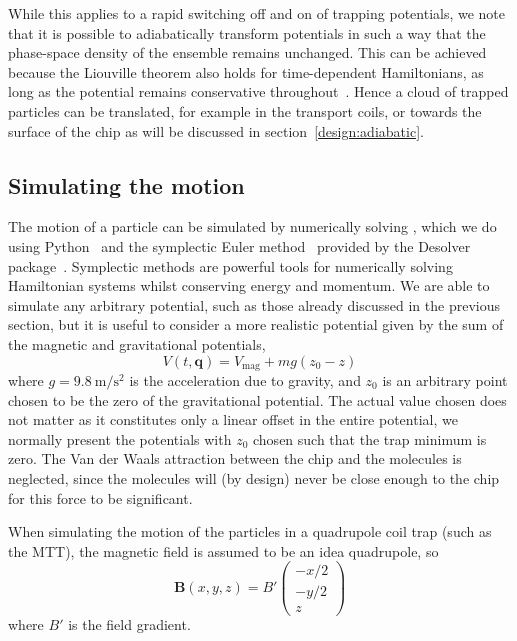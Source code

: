 While this applies to a rapid switching off and on of trapping potentials, we
note that it is possible to adiabatically transform potentials in such a way
that the phase-space density of the ensemble remains unchanged. This can be
achieved because the Liouville theorem also holds for time-dependent
Hamiltonians, as long as the potential remains conservative
throughout~\cite{Hand1998, Lichtenberg1969}. Hence a cloud of trapped particles
can be translated, for example in the transport coils, or towards the surface
of the chip as will be discussed in section~\ref{design:adiabatic}.

\subsection{Simulating the motion}
\label{design:motion:simmethods}

The motion of a particle can be simulated by numerically solving
, which we do using Python~\cite{python} and the
symplectic Euler method~\cite{Hairer2015, doi:10.1119/1.2034523} provided by
the Desolver package~\cite{desolver}. Symplectic methods are powerful tools
for numerically solving Hamiltonian systems whilst conserving energy and
momentum.
%
We are able to simulate any arbitrary potential, such as those already
discussed in the previous section, but it is useful to consider a more
realistic potential given by the sum of the magnetic and gravitational
potentials,
%
\begin{equation}
  V(t, \mathbf{q}) = V_\text{mag} + mg(z_0-z)
\end{equation}
where $g=\SI{9.8}{\meter\per\second\squared}$ is the acceleration due to
gravity, and $z_0$ is an arbitrary point chosen to be the zero of the
gravitational potential. The actual value chosen does not matter as it
constitutes only a linear offset in the entire potential, we normally present
the potentials with $z_0$ chosen such that the trap minimum is zero.
%
The Van der Waals attraction between the chip and the molecules is neglected,
since the molecules will (by design) never be close enough to the chip for this
force to be significant.

When simulating the motion of the particles in a quadrupole coil trap (such as
the MTT), the magnetic field is assumed to be an idea quadrupole, so
%
\begin{equation}
  \mathbf{B}(x, y, z) = B'\begin{pmatrix} -x/2 \\ -y/2 \\ z \end{pmatrix}
\end{equation}
where $B'$ is the field gradient. 

